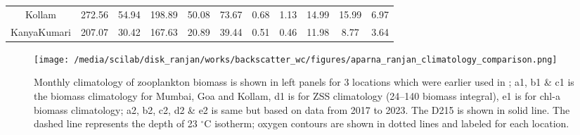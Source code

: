 \documentclass{article}
\newcounter{myfig} %
\begin{document}
\begin{table}[t]
{\begin{adjustwidth}{-0.25in}{0in}
\begin{tabular}{ccccccllccc}
	Kollam                                                                                            & 272.56                    & 54.94                      & 198.89                    & 50.08                   & 73.67                                                                                                                & 0.68                                     & 1.13                                    & 14.99                                           & 15.99                                          & 6.97               \\
	KanyaKumari                                                                                       & 207.07                    & 30.42                      & 167.63                    & 20.89                   & 39.44                                                                                                                & 0.51                                     & 0.46                                    & 11.98                                           & 8.77                                           & 3.64              
\end{tabular}
	\end{adjustwidth}
	}
	\label{mytable:b}
\end{table}


\begin{figure}[htbp]
	\centering
	\texttt{[image: /media/scilab/disk\_ranjan/works/backscatter\_wc/figures/aparna\_ranjan\_climatology\_comparison.png]} 
	\captionsetup{justification=justified,font=footnotesize,skip=0.05\baselineskip,width=\textwidth}
	\caption{Monthly climatology of zooplankton biomass is shown in left panels for 3 locations which were earlier used in \citep{aparna2022seasonal}; a1, b1 \& c1 is the biomass climatology for Mumbai, Goa and Kollam, d1 is for ZSS climatology (24--140 biomass integral), e1 is for chl-a biomass climatology; a2, b2, c2, d2 \& e2 is same but based on data from 2017 to 2023. The D215 is shown in solid line. The dashed line represents the depth of 23 $^\circ$C isotherm; oxygen contours are shown in dotted lines and labeled for each location.}
	\label{fig:zsschlclimcomp}
	\label{myfig:a}
\end{figure}
\end{document}
